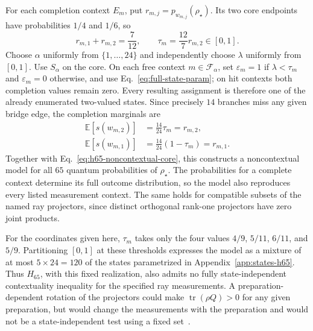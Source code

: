 \documentclass[
  aps,
  pra,
  reprint,
  superscriptaddress,
  amsmath,
  amssymb,
  nofootinbib,
  floatfix
]{revtex4-2}
\theoremstyle{definition}
\theoremstyle{remark}
\begin{document}
For each completion context $E_m$, put $r_{m,j}=p_{w_{m,j}}(\rho_\star)$. Its two core endpoints have probabilities $1/4$ and $1/6$, so
\begin{equation}\label{eq:h65-noncontextual-completion}
r_{m,1}+r_{m,2}=\frac7{12},\qquad
\tau_m=\frac{12}{7}r_{m,2}\in[0,1].
\end{equation}
Choose $\alpha$ uniformly from $\{1,\ldots,24\}$ and independently choose $\lambda$ uniformly from $[0,1]$. Use $S_\alpha$ on the core. On each free context $m\in\mathcal{F}_\alpha$, set $\varepsilon_m=1$ if $\lambda<\tau_m$ and $\varepsilon_m=0$ otherwise, and use Eq.~\eqref{eq:full-state-param}; on hit contexts both completion values remain zero. Every resulting assignment is therefore one of the already enumerated two-valued states. Since precisely $14$ branches miss any given bridge edge, the completion marginals are
\begin{equation}\label{eq:h65-noncontextual-marginals}
\begin{aligned}
\mathbb{E}[s(w_{m,2})]&=\frac{14}{24}\tau_m=r_{m,2},\\
\mathbb{E}[s(w_{m,1})]&=\frac{14}{24}(1-\tau_m)=r_{m,1}.
\end{aligned}
\end{equation}
Together with Eq.~\eqref{eq:h65-noncontextual-core}, this constructs a noncontextual model for all $65$ quantum probabilities of $\rho_\star$. The probabilities for a complete context determine its full outcome distribution, so the model also reproduces every listed measurement context. The same holds for compatible subsets of the named ray projectors, since distinct orthogonal rank-one projectors have zero joint products.

For the coordinates given here, $\tau_m$ takes only the four values $4/9$, $5/11$, $6/11$, and $5/9$. Partitioning $[0,1]$ at these thresholds expresses the model as a mixture of at most $5\times24=120$ of the states parametrized in Appendix~\ref{app:states-h65}. Thus $H_{65}$, with this fixed realization, also admits no fully state-independent contextuality inequality for the specified ray measurements. A preparation-dependent rotation of the projectors could make $\operatorname{tr}(\rho Q)>0$ for any given preparation, but would change the measurements with the preparation and would not be a state-independent test using a fixed set~\cite{cabello2015sic}.
\end{document}
